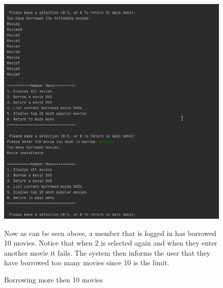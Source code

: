 \documentclass[a4paper,12pt]{article}
\begin{document}
\begin{figure}[!htb]
\centering
\includegraphics[width=1\textwidth]{19}
\caption{Borrowing more then 10 movies}
\medskip
\small
Now as can be seen above, a member that is logged in has borrowed 10 movies. Notice that when 2 is selected again and when they enter another movie it fails. The system then informs the user that they have borrowed too many movies since 10 is the limit.
\end{figure}
\end{document}
